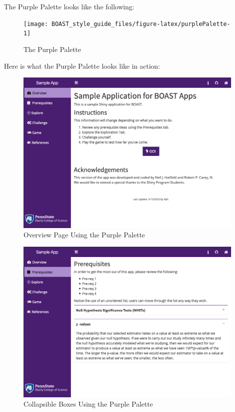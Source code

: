 \documentclass[]{book}
\begin{document}
The Purple Palette looks like the following:

\begin{figure}

{\centering \texttt{[image: BOAST\_style\_guide\_files/figure-latex/purplePalette-1]} 

}

\caption{The Purple Palette}\label{fig:purplePalette}
\end{figure}

Here is what the Purple Palette looks like in action:

\begin{figure}

{\centering \includegraphics[width=14in]{images/purpleOverview} 

}

\caption{Overview Page Using the Purple Palette}\label{fig:purpleAction1}
\end{figure}

\begin{figure}

{\centering \includegraphics[width=14in]{images/purpleCollapse} 

}

\caption{Collapsible Boxes Using the Purple Palette}\label{fig:purpleAction2}
\end{figure}
\end{document}
